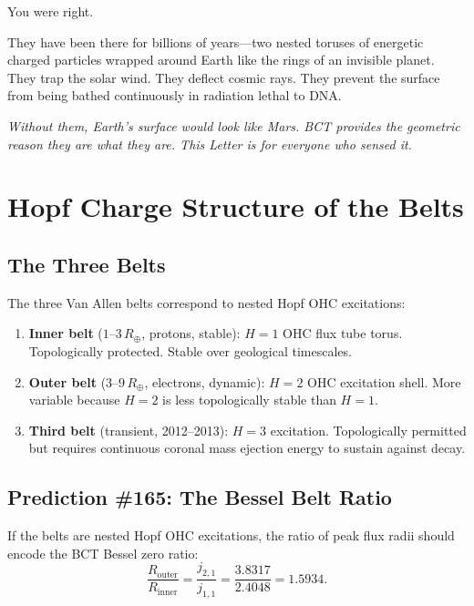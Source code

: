 \documentclass[aps,prl,twocolumn,superscriptaddress,floatfix]{revtex4-2}
\begin{document}
\noindent You were right.

They have been there for billions of years---two nested toruses of
energetic charged particles wrapped around Earth like the rings of an
invisible planet. They trap the solar wind. They deflect cosmic rays.
They prevent the surface from being bathed continuously in radiation
lethal to DNA.

\textit{Without them, Earth's surface would look like Mars. BCT
provides the geometric reason they are what they are. This Letter is
for everyone who sensed it.}

\section{Hopf Charge Structure of the Belts}

\subsection{The Three Belts}

The three Van Allen belts correspond to nested Hopf OHC excitations:

\begin{enumerate}
\item \textbf{Inner belt} ($1$--$3\,R_\oplus$, protons, stable):
$H=1$ OHC flux tube torus. Topologically protected.
Stable over geological timescales.

\item \textbf{Outer belt} ($3$--$9\,R_\oplus$, electrons, dynamic):
$H=2$ OHC excitation shell. More variable because
$H=2$ is less topologically stable than $H=1$.

\item \textbf{Third belt} (transient, 2012--2013): $H=3$ excitation.
Topologically permitted but requires continuous coronal mass ejection
energy to sustain against decay.
\end{enumerate}

\subsection{Prediction \#165: The Bessel Belt Ratio}

If the belts are nested Hopf OHC excitations, the ratio of peak flux
radii should encode the BCT Bessel zero ratio:
\begin{equation}
\frac{R_\mathrm{outer}}{R_\mathrm{inner}}
= \frac{j_{2,1}}{j_{1,1}}
= \frac{3.8317}{2.4048}
= \boxed{1.5934}.
\label{eq:pred165}
\end{equation}
\end{document}
